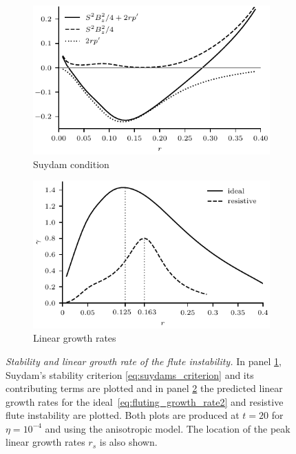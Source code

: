 \documentclass[fleqn,usenatbib]{mnras}
\newcommand{\rev}[1]{{\color{red} {#1}}}
\newcommand{\mycaption}[2]{\caption[#1]{\emph{#1} #2}}
\begin{document}
\begin{figure}
  \centering
    \begin{subfigure}{0.49\textwidth}
      \includegraphics[width=\linewidth]{suydam_condition_4.pdf}
      \caption{Suydam condition}
      \label{fig:suydam_condition_4}
    \end{subfigure}
    \hfill
    \begin{subfigure}{0.49\textwidth}
      \includegraphics[width=\linewidth]{flute_eta-4_stability.pdf}
      \caption{Linear growth rates}
      \label{fig:growth_rate_4}
    \end{subfigure}
\mycaption{Stability and linear growth rate of the flute instability.}{In panel
\ref{fig:suydam_condition_4}, Suydam's stability criterion
\eqref{eq:suydams_criterion} and its contributing terms   are plotted and in
panel \ref{fig:growth_rate_4} the predicted linear growth
rates for the ideal~\eqref{eq:fluting_growth_rate2} and resistive flute instability are plotted. Both plots are produced at
$t=20$ for $\eta=10^{-4}$ and using the anisotropic model. The location of the
\rev{peak linear growth rates $r_s$} is also shown.}
\label{fig:stability_and_growth}%
\end{figure}
\end{document}
